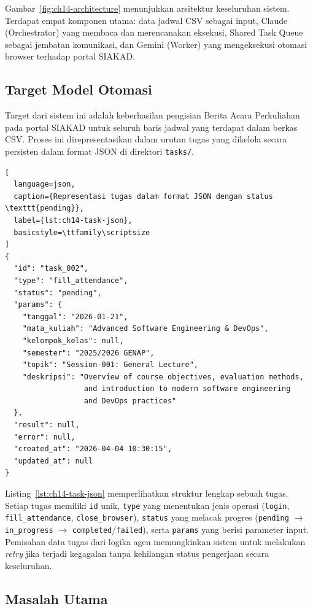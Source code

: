 Gambar~\ref{fig:ch14-architecture} menunjukkan arsitektur keseluruhan sistem. Terdapat empat komponen utama: data jadwal CSV sebagai input, Claude (Orchestrator) yang membaca dan merencanakan eksekusi, Shared Task Queue sebagai jembatan komunikasi, dan Gemini (Worker) yang mengeksekusi otomasi browser terhadap portal SIAKAD.

\subsection{Target Model Otomasi}

Target dari sistem ini adalah keberhasilan pengisian Berita Acara Perkuliahan pada portal SIAKAD untuk seluruh baris jadwal yang terdapat dalam berkas CSV. Proses ini direpresentasikan dalam urutan tugas yang dikelola secara persisten dalam format JSON di direktori \texttt{tasks/}.

\begin{lstlisting}[
  language=json,
  caption={Representasi tugas dalam format JSON dengan status \texttt{pending}},
  label={lst:ch14-task-json},
  basicstyle=\ttfamily\scriptsize
]
{
  "id": "task_002",
  "type": "fill_attendance",
  "status": "pending",
  "params": {
    "tanggal": "2026-01-21",
    "mata_kuliah": "Advanced Software Engineering & DevOps",
    "kelompok_kelas": null,
    "semester": "2025/2026 GENAP",
    "topik": "Session-001: General Lecture",
    "deskripsi": "Overview of course objectives, evaluation methods,
                  and introduction to modern software engineering
                  and DevOps practices"
  },
  "result": null,
  "error": null,
  "created_at": "2026-04-04 10:30:15",
  "updated_at": null
}
\end{lstlisting}

\noindent Listing~\ref{lst:ch14-task-json} memperlihatkan struktur lengkap sebuah tugas. Setiap tugas memiliki \texttt{id} unik, \texttt{type} yang menentukan jenis operasi (\texttt{login}, \texttt{fill\_attendance}, \texttt{close\_browser}), \texttt{status} yang melacak progres (\texttt{pending} $\rightarrow$ \texttt{in\_progress} $\rightarrow$ \texttt{completed}/\texttt{failed}), serta \texttt{params} yang berisi parameter input. Pemisahan data tugas dari logika agen memungkinkan sistem untuk melakukan \textit{retry} jika terjadi kegagalan tanpa kehilangan status pengerjaan secara keseluruhan.

\subsection{Masalah Utama}

